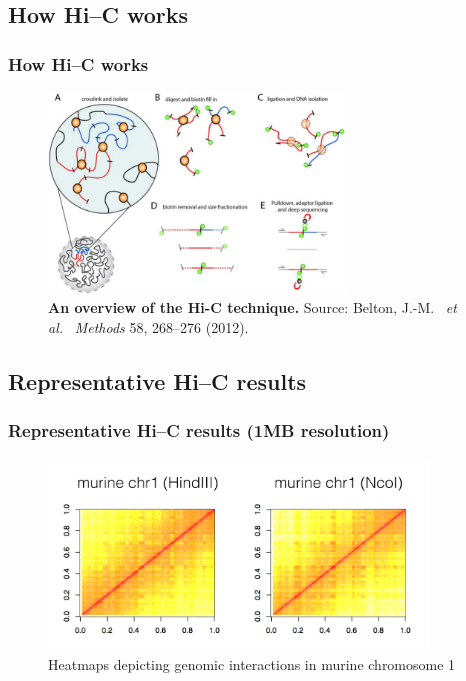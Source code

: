 \documentclass{beamer}
\begin{document}
\subsection{How Hi--C works} %
\label{sub:how_hi_c_works}

\begin{frame}
\frametitle{How Hi--C works}
\begin{figure}[tb]
	\begin{center}
		\includegraphics[width=0.7\textwidth]{./Figures/Hi-C.pdf}
	\end{center}
	\caption{\textbf{An overview of the Hi-C technique.}
	Source: Belton, J.-M. ~\emph{et al.} ~\emph{Methods} 58, 268--276 (2012).}
	\label{fig:figure1}
\end{figure}
\end{frame}

\subsection{Representative Hi--C results} %
\label{sub:subsection_name}

\begin{frame}
\frametitle{Representative Hi--C results (1MB resolution)}
\begin{figure}[tb]
	\begin{center}
		\includegraphics[width=0.9\textwidth]{./Figures/murine_HindIII_NcoI.pdf}
	\end{center}
	\caption{Heatmaps depicting genomic interactions in murine chromosome 1}
	\label{fig:figure2}
\end{figure}
\end{frame}
\end{document}
